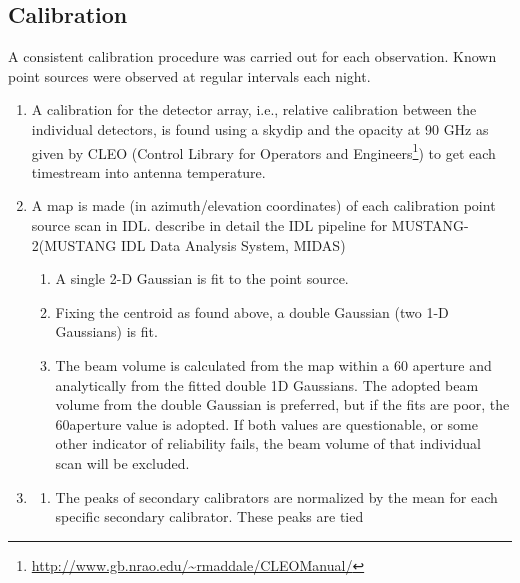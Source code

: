 \documentclass[twocolumn]{aastex62}
\newcommand{\MUSTANG}{MUSTANG-2\xspace}
\begin{document}
\subsection{Calibration}


A consistent calibration procedure was carried out for each observation.
Known point sources were observed at regular intervals each night.

\begin{enumerate}
    \item A calibration for the detector array, i.e., relative calibration between
        the individual detectors, is found using a skydip and the
        opacity at 90 GHz as given by CLEO (Control Library for Operators and
        Engineers\footnote{\url{http://www.gb.nrao.edu/~rmaddale/CLEOManual/}}) to get
        each timestream into
        antenna temperature.
    \item A map is made (in azimuth/elevation coordinates) of each calibration
        point source scan in IDL.  \cite{Romero2019a} describe in detail the
        IDL pipeline for \MUSTANG (MUSTANG IDL Data Analysis System, MIDAS)
        \begin{enumerate}
            \item A single 2-D Gaussian is fit to the point source. 
            \item Fixing the centroid as found above, a double Gaussian (two
                1-D Gaussians) is fit.
            \item The beam volume is calculated from the map within a 60\arcsec
                aperture and analytically from the fitted double 1D Gaussians. The
                adopted beam volume from the double Gaussian is preferred, but
                if the fits are poor, the 60\arcsec aperture value is 
                adopted. If both values are questionable, or some other
                indicator of reliability fails, the beam volume of that
                individual scan will be excluded.
        \end{enumerate}
    \item
        \begin{enumerate}
            \item The peaks of secondary calibrators are normalized by the mean
                for each specific secondary calibrator. These peaks are tied

\end{enumerate}
\end{enumerate}
\end{document}
